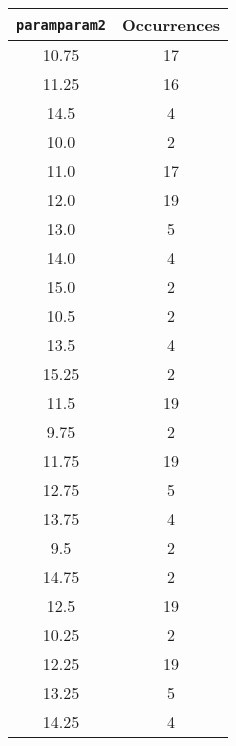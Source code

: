 \documentclass[letterpaper, 12pt]{article}
\begin{document}
\begin{longtable}{|c|c|}
\hline
\textbf{\texttt{paramparam2}} & \textbf{Occurrences} \\
\hline
10.75 & 17 \\
\hline
11.25 & 16 \\
\hline
14.5 & 4 \\
\hline
10.0 & 2 \\
\hline
11.0 & 17 \\
\hline
12.0 & 19 \\
\hline
13.0 & 5 \\
\hline
14.0 & 4 \\
\hline
15.0 & 2 \\
\hline
10.5 & 2 \\
\hline
13.5 & 4 \\
\hline
15.25 & 2 \\
\hline
11.5 & 19 \\
\hline
9.75 & 2 \\
\hline
11.75 & 19 \\
\hline
12.75 & 5 \\
\hline
13.75 & 4 \\
\hline
9.5 & 2 \\
\hline
14.75 & 2 \\
\hline
12.5 & 19 \\
\hline
10.25 & 2 \\
\hline
12.25 & 19 \\
\hline
13.25 & 5 \\
\hline
14.25 & 4 \\
\hline
\end{longtable}
\end{document}
